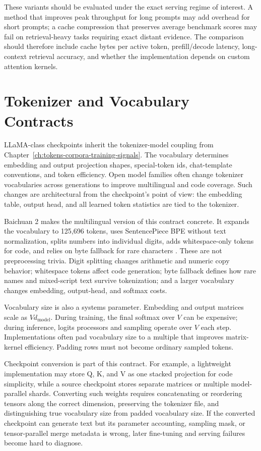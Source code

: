 These variants should be evaluated under the exact serving regime of interest. A method that improves peak throughput for long prompts may add overhead for short prompts; a cache compression that preserves average benchmark scores may fail on retrieval-heavy tasks requiring exact distant evidence. The comparison should therefore include cache bytes per active token, prefill/decode latency, long-context retrieval accuracy, and whether the implementation depends on custom attention kernels.

\section{Tokenizer and Vocabulary Contracts}
\label{sec:llama-tokenizer-vocabulary-contracts}

LLaMA-class checkpoints inherit the tokenizer-model coupling from Chapter~\ref{ch:tokens-corpora-training-signals}. The vocabulary determines embedding and output projection shapes, special-token ids, chat-template conventions, and token efficiency. Open model families often change tokenizer vocabularies across generations to improve multilingual and code coverage. Such changes are architectural from the checkpoint's point of view: the embedding table, output head, and all learned token statistics are tied to the tokenizer.

Baichuan 2 makes the multilingual version of this contract concrete. It expands the vocabulary to 125,696 tokens, uses SentencePiece BPE without text normalization, splits numbers into individual digits, adds whitespace-only tokens for code, and relies on byte fallback for rare characters \cite{yang2023baichuan2}. These are not preprocessing trivia. Digit splitting changes arithmetic and numeric copy behavior; whitespace tokens affect code generation; byte fallback defines how rare names and mixed-script text survive tokenization; and a larger vocabulary changes embedding, output-head, and softmax costs.

Vocabulary size is also a systems parameter. Embedding and output matrices scale as $Vd_{\mathrm{model}}$. During training, the final softmax over $V$ can be expensive; during inference, logits processors and sampling operate over $V$ each step. Implementations often pad vocabulary size to a multiple that improves matrix-kernel efficiency. Padding rows must not become ordinary sampled tokens.

Checkpoint conversion is part of this contract. For example, a lightweight implementation may store Q, K, and V as one stacked projection for code simplicity, while a source checkpoint stores separate matrices or multiple model-parallel shards. Converting such weights requires concatenating or reordering tensors along the correct dimension, preserving the tokenizer file, and distinguishing true vocabulary size from padded vocabulary size. If the converted checkpoint can generate text but its parameter accounting, sampling mask, or tensor-parallel merge metadata is wrong, later fine-tuning and serving failures become hard to diagnose.

